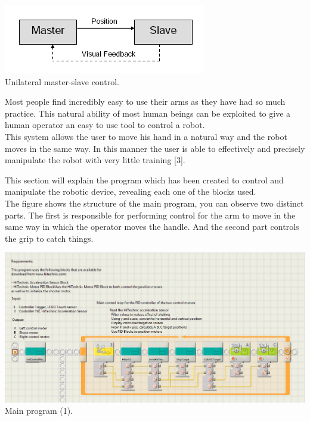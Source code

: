 \documentclass[a4paper,11pt]{article}
\begin{document}
\begin{multicols}{2}
			\begin{center}
				\includegraphics[scale=0.7]{img/master-slave.png}\\
				Unilateral master-slave control.
			\end{center}

			Most people find incredibly easy to use their arms as they have had so much practice. This natural ability of most human beings can be exploited to give a human operator an easy to use tool to control a robot.\\

			This system allows the user to move his hand in a natural way and the robot moves in the same way. In this manner the user is able to effectively and precisely manipulate the robot with very little training [3].


			This section will explain the program which has been created to control and manipulate the robotic device, revealing each one of the blocks used.\\

			The figure shows the structure of the main program, you can observe two distinct parts. The first is responsible for performing control for the arm to move in the same way in which the operator moves the handle. And the second part controls the grip to catch things.\\

	\end{multicols}
	
			\begin{center}
				\includegraphics[scale=0.6]{img/SW_main1.png}\\
				Main program (1).
			\end{center}
\end{document}
